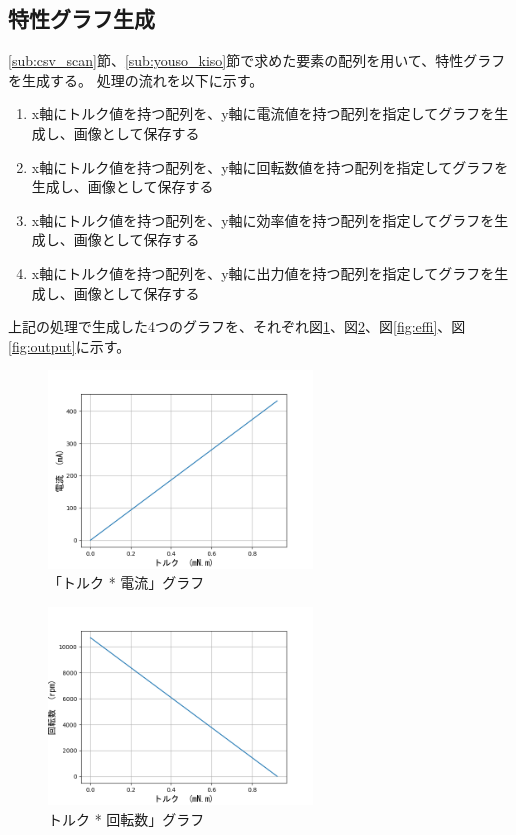 \subsection{特性グラフ生成}\label{sub:toku_gurahu}
\ref{sub:csv_scan}節、\ref{sub:youso_kiso}節で求めた要素の配列を用いて、特性グラフを生成する。
処理の流れを以下に示す。
\begin{enumerate}
    \item x軸にトルク値を持つ配列を、y軸に電流値を持つ配列を指定してグラフを生成し、画像として保存する
    \item x軸にトルク値を持つ配列を、y軸に回転数値を持つ配列を指定してグラフを生成し、画像として保存する
    \item x軸にトルク値を持つ配列を、y軸に効率値を持つ配列を指定してグラフを生成し、画像として保存する
    \item x軸にトルク値を持つ配列を、y軸に出力値を持つ配列を指定してグラフを生成し、画像として保存する
\end{enumerate}
上記の処理で生成した4つのグラフを、それぞれ図\ref{fig:current}、図\ref{fig:speed}、図\ref{fig:effi}、図\ref{fig:output}に示す。
\begin{figure}[t]
	\centering
	\includegraphics[width=7cm]{./Image/current.png}
	\caption{「トルク * 電流」グラフ}
	\label{fig:current}
\end{figure}
\begin{figure}[t]
	\centering
	\includegraphics[width=7cm]{./Image/speed.png}
	\caption{トルク * 回転数」グラフ}
	\label{fig:speed}
\end{figure}
